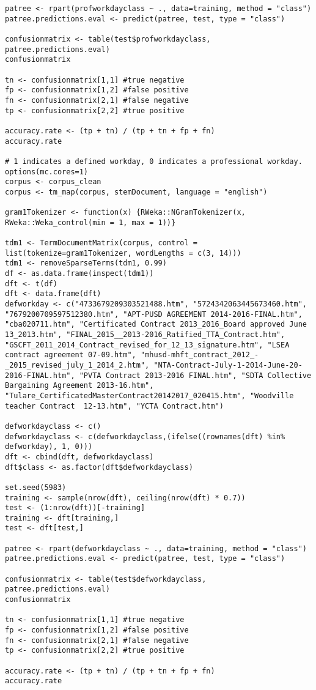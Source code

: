 \begin{lstlisting}
patree <- rpart(profworkdayclass ~ ., data=training, method = "class")
patree.predictions.eval <- predict(patree, test, type = "class")

confusionmatrix <- table(test$profworkdayclass, patree.predictions.eval)
confusionmatrix

tn <- confusionmatrix[1,1] #true negative
fp <- confusionmatrix[1,2] #false positive
fn <- confusionmatrix[2,1] #false negative
tp <- confusionmatrix[2,2] #true positive

accuracy.rate <- (tp + tn) / (tp + tn + fp + fn)
accuracy.rate

# 1 indicates a defined workday, 0 indicates a professional workday.
options(mc.cores=1)
corpus <- corpus_clean
corpus <- tm_map(corpus, stemDocument, language = "english")

gram1Tokenizer <- function(x) {RWeka::NGramTokenizer(x, RWeka::Weka_control(min = 1, max = 1))}

tdm1 <- TermDocumentMatrix(corpus, control = list(tokenize=gram1Tokenizer, wordLengths = c(3, 14)))
tdm1 <- removeSparseTerms(tdm1, 0.99)
df <- as.data.frame(inspect(tdm1))
dft <- t(df)
dft <- data.frame(dft)
defworkday <- c("4733679209303521488.htm", "5724342063445673460.htm", "7679200709597512380.htm", "APT-PUSD AGREEMENT 2014-2016-FINAL.htm", "cba020711.htm", "Certificated Contract 2013_2016_Board approved June 13_2013.htm", "FINAL_2015__2013-2016_Ratified_TTA_Contract.htm", "GSCFT_2011_2014_Contract_revised_for_12_13_signature.htm", "LSEA contract agreement 07-09.htm", "mhusd-mhft_contract_2012_-_2015_revised_july_1_2014_2.htm", "NTA-Contract-July-1-2014-June-20-2016-FINAL.htm", "PVTA Contract 2013-2016 FINAL.htm", "SDTA Collective Bargaining Agreement 2013-16.htm", "Tulare_CertificatedMasterContract20142017_020415.htm", "Woodville  teacher Contract  12-13.htm", "YCTA Contract.htm")

defworkdayclass <- c()
defworkdayclass <- c(defworkdayclass,(ifelse((rownames(dft) %in% defworkday), 1, 0)))
dft <- cbind(dft, defworkdayclass)
dft$class <- as.factor(dft$defworkdayclass)

set.seed(5983)
training <- sample(nrow(dft), ceiling(nrow(dft) * 0.7))
test <- (1:nrow(dft))[-training]
training <- dft[training,]
test <- dft[test,]

patree <- rpart(defworkdayclass ~ ., data=training, method = "class")
patree.predictions.eval <- predict(patree, test, type = "class")

confusionmatrix <- table(test$defworkdayclass, patree.predictions.eval)
confusionmatrix

tn <- confusionmatrix[1,1] #true negative
fp <- confusionmatrix[1,2] #false positive
fn <- confusionmatrix[2,1] #false negative
tp <- confusionmatrix[2,2] #true positive

accuracy.rate <- (tp + tn) / (tp + tn + fp + fn)
accuracy.rate

\end{lstlisting}